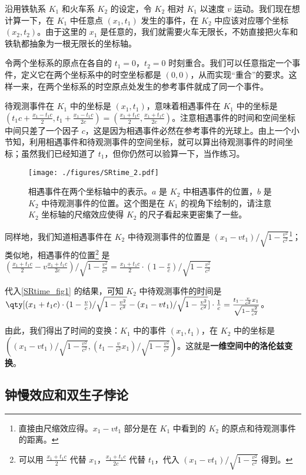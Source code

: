 沿用铁轨系 $K_1$ 和火车系 $K_2$ 的设定，令 $K_2$ 相对 $K_1$ 以速度 $v$ 运动。我们现在想计算一下，在 $K_1$ 中任意点 $(x_1,t_1)$ 发生的事件，在 $K_2$ 中应该对应哪个坐标 $(x_2,t_2)$。由于这里的 $x_1$ 是任意的，我们就需要火车无限长，不妨直接把火车和铁轨都抽象为一根无限长的坐标轴。

令两个坐标系的原点在各自的 $t_1=0$，$t_2=0$ 时刻重合。我们可以任意指定一个事件，定义它在两个坐标系中的时空坐标都是 $(0,0)$，从而实现“重合”的要求。这样一来，在两个坐标系的时空原点处发生的参考事件就成了同一个事件。

待观测事件在 $K_1$ 中的坐标是 $(x_1, t_1)$，意味着相遇事件在 $K_1$ 中的坐标是 $(t_1c+\frac{x_1-t_1c}{2}, t_1+\frac{x_1-t_1c}{2c})=(\frac{x_1+t_1c}{2},\frac{x_1+t_1c}{2c})$。注意相遇事件的时间和空间坐标中间只差了一个因子 $c$，这是因为相遇事件必然在参考事件的光球上。由上一个小节知，利用相遇事件和待观测事件的空间坐标，就可以算出待观测事件的时间坐标；虽然我们已经知道了 $t_1$，但你仍然可以验算一下，当作练习。

\begin{figure}[ht]
\centering
\texttt{[image: ./figures/SRtime\_2.pdf]}
\caption{相遇事件在两个坐标轴中的表示。$a$ 是 $K_2$ 中相遇事件的位置，$b$ 是 $K_2$ 中待观测事件的位置。这个图是在 $K_1$ 的视角下绘制的，请注意 $K_2$ 坐标轴的尺缩效应使得 $K_2$ 的尺子看起来更密集了一些。} \label{SRtime_fig2}
\end{figure}

同样地，我们知道相遇事件在 $K_2$ 中待观测事件的位置是 $(x_1-vt_1)/\sqrt{1-\frac{v^2}{c^2}}$\footnote{直接由尺缩效应得。$x_1-vt_1$ 部分是在 $K_1$ 中看到的 $K_2$ 的原点和待观测事件的距离。}；类似地，相遇事件的位置\footnote{可以用 $\frac{x_1+t_1c}{2}$ 代替 $x_1$，$\frac{x_1+t_1c}{2c}$ 代替 $t_1$，代入 $(x_1-vt_1)/\sqrt{1-\frac{v^2}{c^2}}$ 得到。}  是 $(\frac{x_1+t_1c}{2}-v\frac{x_1+t_1c}{2c})/\sqrt{1-\frac{v^2}{c^2}}=\frac{x_1+t_1c}{2}\cdot(1-\frac{v}{c})/\sqrt{1-\frac{v^2}{c^2}}$

代入\autoref{SRtime_fig1} 的结果，可知 $K_2$ 中待观测事件的时间是 $\qty[(x_1+t_1c)\cdot(1-\frac{v}{c})/\sqrt{1-\frac{v^2}{c^2}}-(x_1-vt_1)/\sqrt{1-\frac{v^2}{c^2}}]\cdot \frac{1}{c}=\frac{t_1-\frac{v}{c^2}x_1}{\sqrt{1-\frac{v^2}{c^2}}}$。

由此，我们得出了时间的变换：$K_1$ 中的事件 $(x_1, t_1)$，在 $K_2$ 中的坐标是 $((x_1-vt_1)/\sqrt{1-\frac{v^2}{c^2}}, (t_1-\frac{v}{c^2}x_1)/\sqrt{1-\frac{v^2}{c^2}})$。这就是\textbf{一维空间中的洛伦兹变换}。

\subsection{钟慢效应和双生子悖论}

